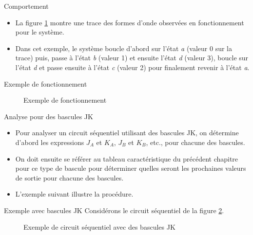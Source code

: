 \documentclass[presentation]{beamer}
\begin{document}
\begin{frame}[label={sec:orgfe2df44}]{Comportement}
\begin{itemize}
\item La figure \ref{fig:org8633e5a} montre une trace des formes d'onde observées en fonctionnement pour le système.

\item Dans cet exemple, le système boucle d'abord sur l'état \emph{a} (valeur 0 sur la trace) puis, passe à l'état \emph{b} (valeur 1) et ensuite l'état \emph{d} (valeur 3), boucle sur l'état \emph{d} et passe ensuite à l'état \emph{c} (valeur 2) pour finalement revenir à l'état \emph{a}.
\end{itemize}
\end{frame}

\begin{frame}[label={sec:org73bc1c0}]{Exemple de fonctionnement}
\begin{figure}[htbp]
\centering

\caption{\label{fig:org8633e5a}Exemple de fonctionnement}
\end{figure}
\end{frame}

\begin{frame}[label={sec:org3690dbf}]{Analyse pour des bascules JK}
\begin{itemize}
\item Pour analyser un circuit séquentiel utilisant des bascules JK, on détermine d'abord les expressions \(J_A\) et \(K_A\), \(J_B\) et \(K_B\), etc., pour chacune des bascules.

\item On doit ensuite se référer au tableau caractéristique du précédent chapitre pour ce type de bascule pour déterminer quelles seront les prochaines valeurs de sortie pour chacune des bascules.

\item L'exemple suivant illustre la procédure.
\end{itemize}
\end{frame}

\begin{frame}[label={sec:orgca53c92}]{Exemple avec bascules JK}
Considérons le circuit séquentiel de la figure \ref{fig:org61aaa93}.

\begin{figure}[htbp]
\centering

\caption{\label{fig:org61aaa93}Exemple de circuit séquentiel avec des bascules JK}
\end{figure}
\end{frame}
\end{document}
